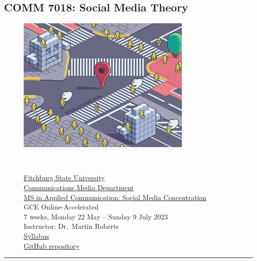 \documentclass[
  letterpaper,
  DIV=11,
  numbers=noendperiod,
  oneside]{scrartcl}
\author{}
\date{}
\begin{document}
\subsection{COMM 7018: Social Media
Theory}\label{comm-7018-social-media-theory}

\begin{figure}

\begin{minipage}{0.49\linewidth}
\href{http://polyducks.co.uk/}{\includegraphics{img/polyducks.gif}}\end{minipage}%
%
\begin{minipage}{0.02\linewidth}
~\end{minipage}%
%
\begin{minipage}{0.49\linewidth}
\href{https://fitchburgstate.edu}{Fitchburg State University}\\
\href{https://www.fitchburgstate.edu/academics/academic-schools/school-arts-and-sciences/communications-media-department}{Communications
Media Department}\\
\href{https://www.fitchburgstate.edu/academics/programs/social-media-concentration-applied-communication-ms-online}{MS
in Applied Communication: Social Media Concentration}\\
GCE Online-Accelerated\\
7 weeks, Monday 22 May -- Sunday 9 July 2023\\
Instructor: Dr.~Martin Roberts\\
\href{https://mroberts1.github.io/social-media-theory-summer-2023}{Syllabus}\\
\href{https://github.com/mroberts1/social-media-theory-summer-2023}{GitHub
repository}\end{minipage}%

\end{figure}%

\begin{center}\rule{0.5\linewidth}{0.5pt}\end{center}
\end{document}
